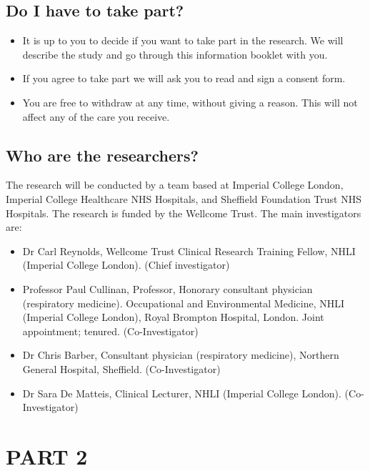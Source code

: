 \documentclass[a4paper,10pt]{article}
\begin{document}
\subsection*{Do I have to take part?}
\begin{itemize}
 \item It is up to you to decide if you want to take part in the research. We will describe the study and go through this information booklet with you.
 \item If you agree to take part we will ask you to read and sign a consent form.
 \item You are free to withdraw at any time, without giving a reason. This will not affect any of the care you receive.
\end{itemize}

 
\subsection*{Who are the researchers?}
The research will be conducted by a team based at Imperial College London, Imperial College Healthcare NHS Hospitals, and Sheffield Foundation Trust NHS Hospitals. The research is funded by the Wellcome Trust. The main investigators are:
\begin{itemize}
    \item Dr Carl Reynolds, Wellcome Trust Clinical Research Training Fellow, NHLI (Imperial College London). (Chief investigator)
 \item Professor Paul Cullinan, Professor, Honorary consultant physician (respiratory medicine). Occupational and Environmental Medicine, NHLI (Imperial College London), Royal Brompton Hospital, London. Joint appointment; tenured. (Co-Investigator)
 \item Dr Chris Barber, Consultant physician (respiratory medicine), Northern General Hospital, Sheffield. (Co-Investigator)
 \item Dr Sara De Matteis, Clinical Lecturer, NHLI (Imperial College London). (Co-Investigator)
\end{itemize}

\section*{PART 2}
\end{document}
